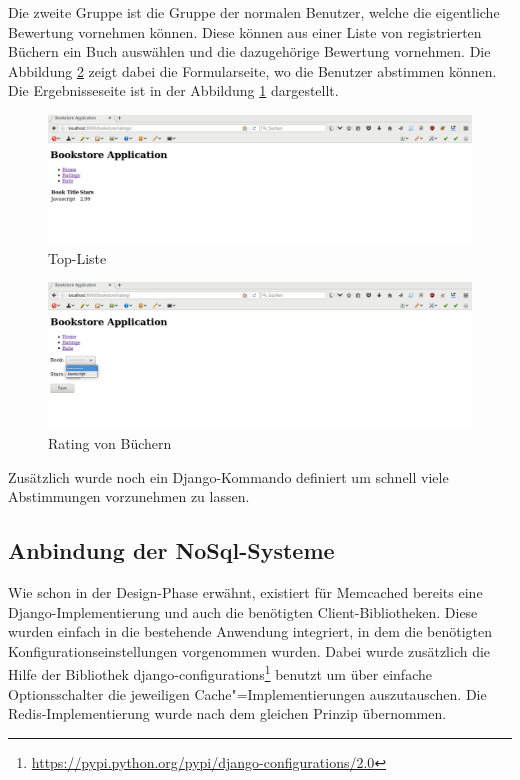 Die zweite Gruppe ist die Gruppe der normalen Benutzer, welche die eigentliche
Bewertung vornehmen können. Diese können aus einer Liste von registrierten
Büchern ein Buch auswählen und die dazugehörige Bewertung vornehmen. Die
Abbildung \ref{fig:django-rate} zeigt dabei die Formularseite, wo die Benutzer 
abstimmen können. Die Ergebnisseseite ist in der Abbildung \ref{fig:django-list}
dargestellt.

\begin{figure}
\centering
\includegraphics[scale=0.25]{images/Ratings.png}
\caption{Top-Liste}
\label{fig:django-list}
\end{figure}

\begin{figure}
\centering
\includegraphics[scale=0.25]{images/Rating.png}
\caption{Rating von Büchern}
\label{fig:django-rate}
\end{figure}

Zusätzlich wurde noch ein Django-Kommando definiert um schnell viele Abstimmungen
vorzunehmen zu lassen.

\subsection{Anbindung der NoSql-Systeme}
Wie schon in der Design-Phase erwähnt, existiert für Memcached bereits eine
Django-Implementierung und auch die benötigten Client-Bibliotheken. Diese wurden
einfach in die bestehende Anwendung integriert, in dem die benötigten
Konfigurationseinstellungen vorgenommen wurden. Dabei wurde zusätzlich die Hilfe
der Bibliothek django-configurations\footnote{\url{https://pypi.python.org/pypi/django-configurations/2.0}}
benutzt um über einfache Optionsschalter die jeweiligen Cache"=Implementierungen
auszutauschen. Die Redis-Implementierung wurde nach dem gleichen Prinzip
übernommen.

